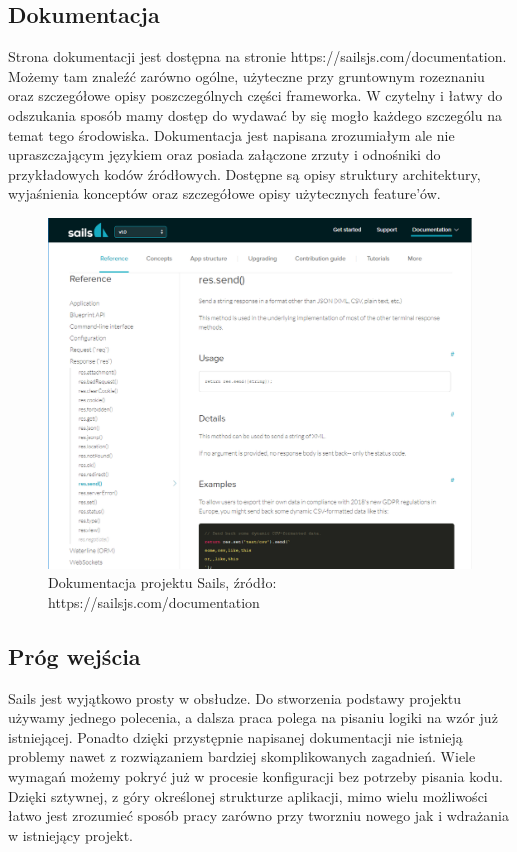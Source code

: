 \documentclass[12pt]{report}
\begin{document}
    \subsection{Dokumentacja}
      Strona dokumentacji jest dostępna na stronie https://sailsjs.com/documentation.
      Możemy tam znaleźć zarówno ogólne, użyteczne przy gruntownym rozeznaniu oraz szczegółowe opisy poszczególnych części frameworka.
      W czytelny i łatwy do odszukania sposób mamy dostęp do wydawać by się mogło każdego szczególu na temat tego środowiska.
      Dokumentacja jest napisana zrozumiałym ale nie upraszczającym językiem oraz posiada załączone zrzuty i odnośniki do przykładowych kodów źródłowych.
      Dostępne są opisy struktury architektury, wyjaśnienia konceptów oraz szczegółowe opisy użytecznych feature'ów.
      \begin{figure}[!hb]
        \centering
        \includegraphics[width=\textwidth,height=\textheight,keepaspectratio]{doc_sails.png} 
        \caption{Dokumentacja projektu Sails, źródło: https://sailsjs.com/documentation}
      \end{figure}

    \subsection{Próg wejścia}
      Sails jest wyjątkowo prosty w obsłudze.
      Do stworzenia podstawy projektu używamy jednego polecenia, a dalsza praca polega na pisaniu logiki na wzór już istniejącej.
      Ponadto dzięki przystępnie napisanej dokumentacji nie istnieją problemy nawet z rozwiązaniem bardziej skomplikowanych zagadnień.
      Wiele wymagań możemy pokryć już w procesie konfiguracji bez potrzeby pisania kodu.
      Dzięki sztywnej, z góry określonej strukturze aplikacji, mimo wielu możliwości łatwo jest zrozumieć sposób pracy zarówno przy tworzniu nowego jak i wdrażania w istniejący projekt. 
\end{document}
